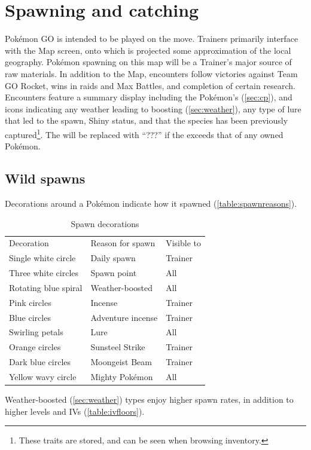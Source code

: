 \chapter{Spawning and catching\label{chap:spawn}}
Pokémon GO is intended to be played on the move.
Trainers primarily interface with the Map screen, onto which is projected
  some approximation of the local geography.
Pokémon spawning on this map will be a Trainer's major source of raw materials.
In addition to the Map, encounters follow victories against Team GO Rocket,
  wins in raids and Max Battles, and completion of certain research.
Encounters feature a summary display including the Pokémon's \CP{} (\autoref{sec:cp}),
  and icons indicating any weather leading to boosting (\autoref{sec:weather}),
  any type of lure that led to the spawn,
  Shiny status,
  and that the species has been previously captured\footnote{These traits are stored, and can be seen when browsing inventory.}.
The \CP{} will be replaced with ``???'' if the \CP{} exceeds that of any owned Pokémon.

\section{Wild spawns\label{sec:spawns}}
Decorations around a Pokémon indicate how it spawned (\autoref{table:spawnreasons}).
\begin{table}
\centering
\begin{tabular}{lll}
  Decoration & Reason for spawn & Visible to\\
\Midrule
  Single white circle & Daily spawn & Trainer\\
  Three white circles & Spawn point & All\\
  Rotating blue spiral & Weather-boosted & All\\
  Pink circles & Incense & Trainer\\
  Blue circles & Adventure incense & Trainer\\
  Swirling petals & Lure & All\\
  Orange circles & Sunsteel Strike & Trainer\\
  Dark blue circles & Moongeist Beam & Trainer\\
  Yellow wavy circle & Mighty Pokémon & All
\end{tabular}
  \caption{Spawn decorations\label{table:spawnreasons}}
\end{table}
Weather-boosted (\autoref{sec:weather}) types enjoy higher spawn rates,
  in addition to higher levels and IVs (\autoref{table:ivfloors}).


